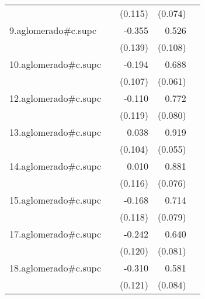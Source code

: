 {\begin{longtable}{l*{4}{D{.}{.}{-1}}}
            &                     &     (0.115)         &     (0.074)         &                     \\
\addlinespace
9.aglomerado#c.supc&                     &      -0.355\sym{*}  &       0.526\sym{***}&                     \\
            &                     &     (0.139)         &     (0.108)         &                     \\
\addlinespace
10.aglomerado#c.supc&                     &      -0.194         &       0.688\sym{***}&                     \\
            &                     &     (0.107)         &     (0.061)         &                     \\
\addlinespace
12.aglomerado#c.supc&                     &      -0.110         &       0.772\sym{***}&                     \\
            &                     &     (0.119)         &     (0.080)         &                     \\
\addlinespace
13.aglomerado#c.supc&                     &       0.038         &       0.919\sym{***}&                     \\
            &                     &     (0.104)         &     (0.055)         &                     \\
\addlinespace
14.aglomerado#c.supc&                     &       0.010         &       0.881\sym{***}&                     \\
            &                     &     (0.116)         &     (0.076)         &                     \\
\addlinespace
15.aglomerado#c.supc&                     &      -0.168         &       0.714\sym{***}&                     \\
            &                     &     (0.118)         &     (0.079)         &                     \\
\addlinespace
17.aglomerado#c.supc&                     &      -0.242\sym{*}  &       0.640\sym{***}&                     \\
            &                     &     (0.120)         &     (0.081)         &                     \\
\addlinespace
18.aglomerado#c.supc&                     &      -0.310\sym{*}  &       0.581\sym{***}&                     \\
            &                     &     (0.121)         &     (0.084)         &                     \\

\end{longtable}}
